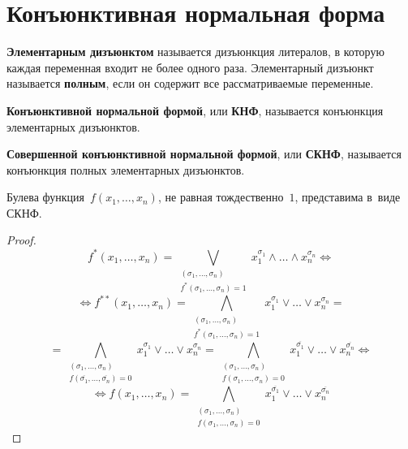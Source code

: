 \section{Конъюнктивная нормальная форма}
 \textbf{Элементарным дизъюнктом} называется дизъюнкция литералов, в которую каждая переменная входит не более одного раза.
Элементарный дизъюнкт называется \textbf{полным}, если он содержит все рассматриваемые переменные.

\textbf{Конъюнктивной нормальной формой}, или \textbf{КНФ}, называется конъюнкция элементарных дизъюнктов.

\textbf{Совершенной конъюнктивной нормальной формой}, или \textbf{СКНФ}, называется конъюнкция полных элементарных дизъюнктов.

\begin{statement}
Булева функция~$f(x_1, \ldots, x_n)$, не равная тождественно~$1$, представима в~виде СКНФ.
\end{statement}
\begin{proof}
\begin{equation*}
f^*(x_1, \ldots, x_n) = \bigvee_{\begin{smallmatrix}
(\sigma_1, \ldots, \sigma_n) \\
f^*(\sigma_1, \ldots, \sigma_n) = 1
\end{smallmatrix}} x_1^{\sigma_1} \land \ldots \land x_n^{\sigma_n} \Leftrightarrow
\end{equation*}
\begin{equation*}
\Leftrightarrow f^{**}(x_1, \ldots, x_n) =
\bigwedge_{\begin{smallmatrix}
(\sigma_1, \ldots, \sigma_n) \\
f^*(\sigma_1, \ldots, \sigma_n) = 1
\end{smallmatrix}} x_1^{\sigma_1} \lor \ldots \lor x_n^{\sigma_n} =
\end{equation*}
\begin{equation*}
= \bigwedge_{\begin{smallmatrix}
(\sigma_1, \ldots, \sigma_n) \\
f(\overline{\sigma_1}, \ldots, \overline{\sigma_n}) = 0
\end{smallmatrix}} x_1^{\sigma_1} \lor \ldots \lor x_n^{\sigma_n} =
\bigwedge_{\begin{smallmatrix}
(\sigma_1, \ldots, \sigma_n) \\
f(\sigma_1, \ldots, \sigma_n) = 0
\end{smallmatrix}} x_1^{\overline{\sigma_1}} \lor \ldots \lor x_n^{\overline{\sigma_n}} \Leftrightarrow
\end{equation*}
\begin{equation*}
\Leftrightarrow f(x_1, \ldots, x_n)
= \bigwedge_{\begin{smallmatrix}
(\sigma_1, \ldots, \sigma_n) \\
f(\sigma_1, \ldots, \sigma_n) = 0
\end{smallmatrix}} x_1^{\overline{\sigma_1}} \lor \ldots \lor x_n^{\overline{\sigma_n}}
\end{equation*}
\end{proof}